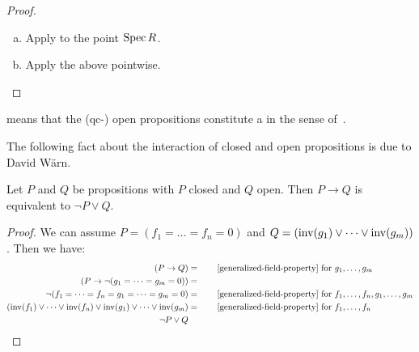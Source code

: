 \begin{proof}
  \begin{enumerate}[(a)]
  \item Apply  to the point $\operatorname{Spec} R$.
  \item Apply the above pointwise.
  \end{enumerate}
\end{proof}

\begin{remark}
   means that
  the (qc-) open propositions constitute a 
  in the sense of~\cite{rosolini-phd-thesis}.
\end{remark}

The following fact about the interaction of closed and open propositions
is due to David Wärn.

\begin{lemma}%
  \label{implication-from-closed-to-open}
  Let $P$ and $Q$ be propositions
  with $P$ closed and $Q$ open.
  Then $P \to Q$ is equivalent to $\lnot P \lor Q$.
\end{lemma}

\begin{proof}
  We can assume $P = (f_1 = \dots = f_n = 0)$
  and $Q = (\mathrm{inv}(g_1) \lor \dots \lor \mathrm{inv}(g_m))$.
  Then we have:
  \begin{align*}
    (P \to Q) &= \qquad
    \text{\Cref{generalized-field-property} for $g_1, \dots, g_m$}\\
    (P \to \lnot (g_1 = \dots = g_m = 0)) &= \\
    \lnot (f_1 = \dots = f_n = g_1 = \dots = g_m = 0) &= \qquad
    \text{\Cref{generalized-field-property} for $f_1, \dots, f_n, g_1, \dots, g_m$}\\
    (\inv(f_1) \lor \dots \lor \inv(f_n) \lor \inv(g_1) \lor \dots \lor \inv(g_m) &= \qquad
    \text{\Cref{generalized-field-property} for $f_1, \dots, f_n$}\\
    \lnot P \lor Q &
  \end{align*}
\end{proof}

